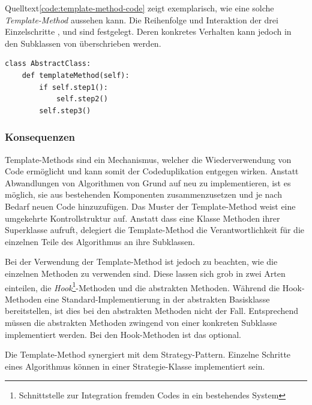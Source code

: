 Quelltext\ref{code:template-method-code} zeigt exemplarisch, wie eine solche \emph{Template-Method} aussehen kann. Die Reihenfolge und Interaktion der drei Einzelschritte ,  und  sind festgelegt. Deren konkretes Verhalten kann jedoch in den Subklassen von  überschrieben werden.

\lstset{language=python}
\begin{lstlisting}[caption={Exemplarische Implementierung einer Template-Method}, label=code:template-method-code]
class AbstractClass:
	def templateMethod(self):
    	if self.step1():
        	self.step2()
    	self.step3()
\end{lstlisting}


\subsubsection*{Konsequenzen}

Template-Methods sind ein Mechanismus, welcher die Wiederverwendung von Code ermöglicht und kann somit der Codeduplikation entgegen wirken. Anstatt Abwandlungen von Algorithmen von Grund auf neu zu implementieren, ist es möglich, sie aus bestehenden Komponenten zusammenzusetzen und je nach Bedarf neuen Code hinzuzufügen. Das Muster der Template-Method weist eine umgekehrte Kontrollstruktur auf. Anstatt dass eine Klasse Methoden ihrer Superklasse aufruft, delegiert die Template-Method die Verantwortlichkeit für die einzelnen Teile des Algorithmus an ihre Subklassen.

Bei der Verwendung der Template-Method ist jedoch zu beachten, wie die einzelnen Methoden zu verwenden sind. Diese lassen sich grob in zwei Arten einteilen, die \emph{Hook}\footnote{Schnittstelle zur Integration fremden Codes in ein bestehendes System}-Methoden und die abstrakten Methoden. Während die Hook-Methoden eine Standard-Implementierung in der abstrakten Basisklasse bereitstellen, ist dies bei den abstrakten Methoden nicht der Fall. Entsprechend müssen die abstrakten Methoden zwingend von einer konkreten Subklasse implementiert werden. Bei den Hook-Methoden ist das optional.

Die Template-Method synergiert mit dem Strategy-Pattern. Einzelne Schritte eines Algorithmus können in einer Strategie-Klasse implementiert sein. \cite{gamma_design_1995}